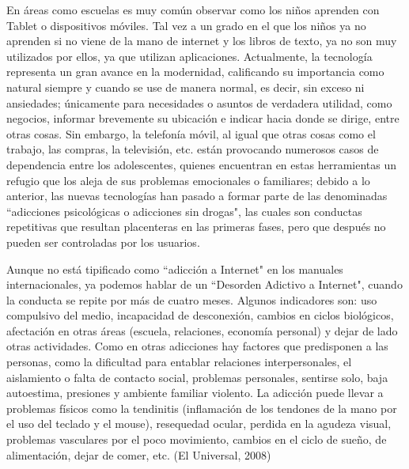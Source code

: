 \documentclass[10pt,a4paper]{article}
\begin{document}
En {\'a}reas como escuelas es muy com{\'u}n observar como los ni{\~n}os aprenden con Tablet o dispositivos m{\'o}viles. Tal vez a un grado en el que los ni{\~n}os ya no aprenden si no viene de la mano de internet y los libros de texto, ya no son muy utilizados por ellos, ya que utilizan aplicaciones.
Actualmente, la tecnolog{\'i}a representa un gran avance en la modernidad, calificando su importancia como natural siempre y cuando se use de manera normal, es decir, sin exceso ni ansiedades; {\'u}nicamente para necesidades o asuntos de verdadera utilidad, como negocios, informar brevemente su ubicaci{\'o}n e indicar hacia donde se dirige, entre otras cosas. Sin embargo, la telefon{\'i}a m{\'o}vil, al igual que otras cosas como el trabajo, las compras, la televisi{\'o}n, etc. est{\'a}n provocando numerosos casos de dependencia entre los adolescentes, quienes encuentran en estas herramientas un refugio que los aleja de sus problemas emocionales o familiares; debido a lo anterior, las nuevas tecnolog{\'i}as han pasado a formar parte de las denominadas ``adicciones psicol{\'o}gicas o adicciones sin drogas", las cuales son conductas repetitivas que resultan placenteras en las primeras fases, pero que despu{\'e}s no pueden ser controladas por los usuarios.

Aunque no est{\'a} tipificado como ``adicci{\'o}n a Internet" en los manuales internacionales, ya podemos hablar de un ``Desorden Adictivo a Internet", cuando la conducta se repite por m{\'a}s de cuatro meses. Algunos indicadores son: uso compulsivo del medio, incapacidad de desconexi{\'o}n, cambios en ciclos biol{\'o}gicos, afectaci{\'o}n en otras {\'a}reas (escuela, relaciones, econom{\'i}a personal) y dejar de lado otras actividades. Como en otras adicciones hay factores que predisponen a las personas, como la dificultad para entablar relaciones interpersonales, el aislamiento o falta de contacto social, problemas personales, sentirse solo, baja autoestima, presiones y ambiente familiar violento. La adicci{\'o}n puede llevar a problemas f{\'i}sicos como la tendinitis (inflamaci{\'o}n de los tendones de la mano por el uso del teclado y el mouse), resequedad ocular, perdida en la agudeza visual, problemas vasculares por el poco movimiento, cambios en el ciclo de sue{\~n}o, de alimentaci{\'o}n, dejar de comer, etc. (El Universal, 2008)
\end{document}
